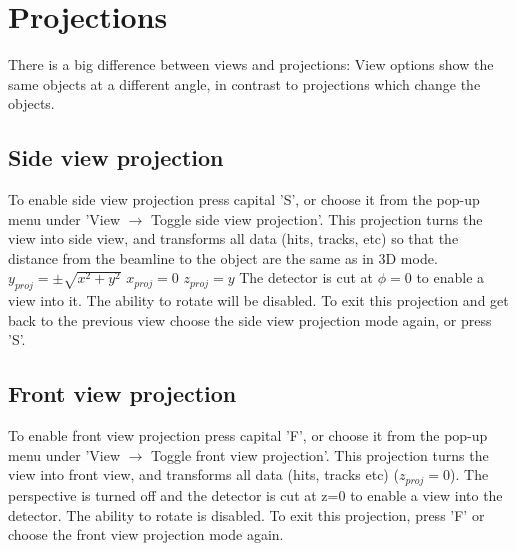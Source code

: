 \documentclass[a4paper,10pt]{article}
\begin{document}
\section{Projections}
There is a big difference between views and projections: View options show the same objects at a different angle, in contrast to projections which change the objects. 

\subsection{Side view projection}
To enable side view projection press capital 'S', or choose it from the pop-up menu under 'View $\rightarrow$ Toggle side view projection'. This projection turns the view into side view, and transforms all data (hits, tracks, etc) so that the distance from the beamline to the object are the same as in 3D mode.
\newline\newline
$y_{proj} = \pm \sqrt{x^2 + y^2}$\newline
$x_{proj}=0$\newline
$z_{proj} = y$ \newline
\newline
The detector is cut at $\phi=0$ to enable a view into it. The ability to rotate will be disabled. To exit this projection and get back to the previous view choose the side view projection mode again, or press 'S'. 




\subsection{Front view projection}
To enable front view projection press capital 'F', or choose it from the pop-up menu under 'View $\rightarrow$ Toggle front view projection'. This projection turns the view into front view, and transforms all data (hits, tracks etc)
($z_{proj} = 0$). The perspective is turned off and the detector is cut at z=0 to enable a view into the detector. The ability to rotate is disabled. To exit this projection, press 'F' or choose the front view projection mode again. 
\end{document}
